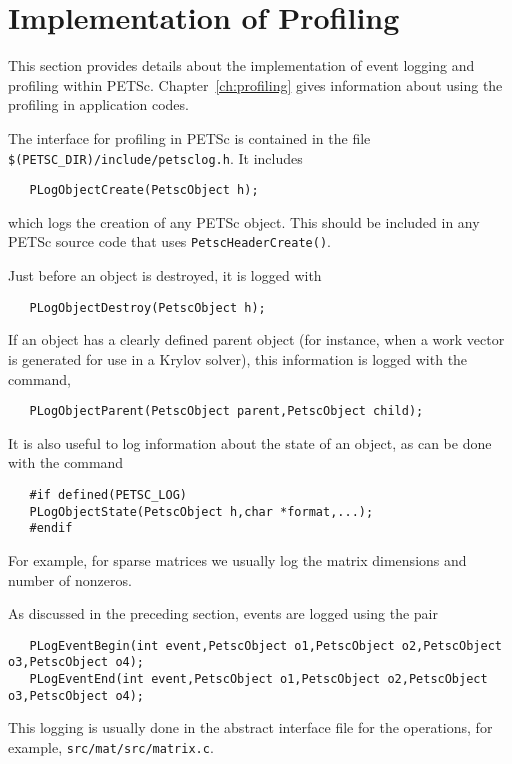 \section{Implementation of Profiling}
\label{sec:profimpl}

This section provides details about the implementation of event
logging and profiling within PETSc.   Chapter~\ref{ch:profiling}
gives information about using the profiling in application codes. 

The interface for profiling in PETSc is contained in the file 
{\tt \$(PETSC\_DIR)/include/petsclog.h}. It includes 
\begin{verbatim}
   PLogObjectCreate(PetscObject h);
\end{verbatim}
which logs the creation of any PETSc object. This should be included in 
any PETSc source code that uses {\tt PetscHeaderCreate()}. 

Just before an object is destroyed, it is logged
with  
\begin{verbatim}
   PLogObjectDestroy(PetscObject h);
\end{verbatim}

If an object has a clearly defined parent object (for instance, when 
a work vector is generated for use in a Krylov solver), this information
is logged with the command, 
\begin{verbatim}
   PLogObjectParent(PetscObject parent,PetscObject child);
\end{verbatim}
It is also useful to log information about the state of an object, as can
be done with the command 
\begin{verbatim}
   #if defined(PETSC_LOG)
   PLogObjectState(PetscObject h,char *format,...);
   #endif
\end{verbatim}
For example, for sparse matrices we usually log the matrix 
dimensions and number of nonzeros.

As discussed in the preceding section, events are logged using the 
pair 
\begin{verbatim}
   PLogEventBegin(int event,PetscObject o1,PetscObject o2,PetscObject o3,PetscObject o4);
   PLogEventEnd(int event,PetscObject o1,PetscObject o2,PetscObject o3,PetscObject o4);
\end{verbatim}
This logging is usually done in the abstract
interface file for the operations, for example, {\tt src/mat/src/matrix.c}.

